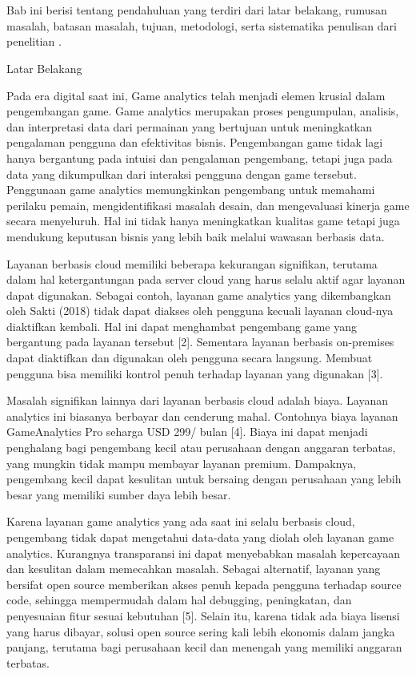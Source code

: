 \chapter{\babSatu}
\label{bab:1}
Bab ini berisi tentang pendahuluan yang terdiri dari latar belakang, rumusan masalah, batasan masalah, tujuan, metodologi, serta sistematika penulisan dari penelitian \cite{book:sample}.

Latar Belakang

Pada era digital saat ini, Game analytics telah menjadi elemen krusial dalam pengembangan game. Game analytics merupakan proses pengumpulan, analisis, dan interpretasi data dari permainan yang bertujuan untuk meningkatkan pengalaman pengguna dan efektivitas bisnis. Pengembangan game tidak lagi hanya bergantung pada intuisi dan pengalaman pengembang, tetapi juga pada data yang dikumpulkan dari interaksi pengguna dengan game tersebut. Penggunaan game analytics memungkinkan pengembang untuk memahami perilaku pemain, mengidentifikasi masalah desain, dan mengevaluasi kinerja game secara menyeluruh. Hal ini tidak hanya meningkatkan kualitas game tetapi juga mendukung keputusan bisnis yang lebih baik melalui wawasan berbasis data.

Layanan berbasis cloud memiliki beberapa kekurangan signifikan, terutama dalam hal ketergantungan pada server cloud yang harus selalu aktif agar layanan dapat digunakan. Sebagai contoh, layanan game analytics yang dikembangkan oleh Sakti (2018) tidak dapat diakses oleh pengguna kecuali layanan cloud-nya diaktifkan kembali. Hal ini dapat menghambat pengembang game yang bergantung pada layanan tersebut [2]. Sementara layanan berbasis on-premises dapat diaktifkan dan digunakan oleh pengguna secara langsung. Membuat pengguna bisa memiliki kontrol penuh terhadap layanan yang digunakan [3].

Masalah signifikan lainnya dari layanan berbasis cloud adalah biaya. Layanan analytics ini biasanya berbayar dan cenderung mahal. Contohnya biaya layanan GameAnalytics Pro seharga USD 299/ bulan [4]. Biaya ini dapat menjadi penghalang bagi pengembang kecil atau perusahaan dengan anggaran terbatas, yang mungkin tidak mampu membayar layanan premium. Dampaknya, pengembang kecil dapat kesulitan untuk bersaing dengan perusahaan yang lebih besar yang memiliki sumber daya lebih besar.

Karena layanan game analytics yang ada saat ini selalu berbasis cloud, pengembang tidak dapat mengetahui data-data yang diolah oleh layanan game analytics. Kurangnya transparansi ini dapat menyebabkan masalah kepercayaan dan kesulitan dalam memecahkan masalah. Sebagai alternatif, layanan yang bersifat open source memberikan akses penuh kepada pengguna terhadap source code, sehingga mempermudah dalam hal debugging, peningkatan, dan penyesuaian fitur sesuai kebutuhan [5]. Selain itu, karena tidak ada biaya lisensi yang harus dibayar, solusi open source sering kali lebih ekonomis dalam jangka panjang, terutama bagi perusahaan kecil dan menengah yang memiliki anggaran terbatas.

